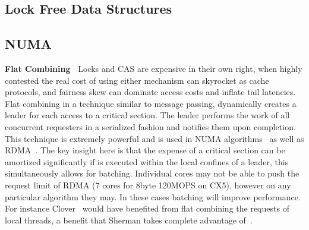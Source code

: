   
  

\subsection{Lock Free Data Structures}


\subsection{NUMA}

\textbf{Flat Combining~\cite{flat-combine}} Locks and CAS are expensive in their
own right, when highly contested the real cost of using either mechanism can
skyrocket as cache protocols, and fairness skew can dominate access costs and
inflate tail latencies. Flat combining in a technique similar to message
passing, dynamically creates a leader for each access to a critical section. The
leader performs the work of all concurrent requesters in a serialized fashion
and notifies them upon completion. This technique is extremely powerful and is
used in NUMA algorithms~\cite{black-box-numa} as well as RDMA~\cite{flock}. The
key insight here is that the expense of a critical section can be amortized
significantly if is executed within the local confines of a leader, this
simultaneously allows for batching. Individual cores may not be able to push the
request limit of RDMA (7 cores for 8byte 120MOPS on CX5), however on
any particular algorithm they may. In these cases batching will improve
performance. For instance Clover~\cite{clover} would have benefited from flat
combining the requests of local threads, a benefit that Sherman takes complete
advantage of~\cite{sherman}.


